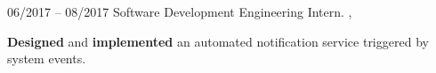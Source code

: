 
\begin{entrylist}
	\entry
		{06/2017 -- 08/2017}
		{Software Development Engineering Intern.}
		{\avs, \atoz}
		{\textbf{Designed} and \textbf{implemented} an automated notification service triggered by system events.

		}
\end{entrylist}
